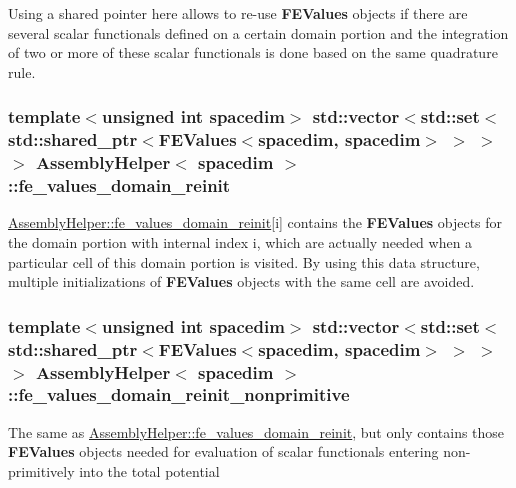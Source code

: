 Using a shared pointer here allows to re-\/use {\bf F\+E\+Values} objects if there are several scalar functionals defined on a certain domain portion and the integration of two or more of these scalar functionals is done based on the same quadrature rule. 
\subsubsection[{\texorpdfstring{fe\+\_\+values\+\_\+domain\+\_\+reinit}{fe_values_domain_reinit}}]{\setlength{\rightskip}{0pt plus 5cm}template$<$unsigned int spacedim$>$ std\+::vector$<$std\+::set$<$std\+::shared\+\_\+ptr$<${\bf F\+E\+Values}$<$spacedim, spacedim$>$ $>$ $>$ $>$ {\bf Assembly\+Helper}$<$ spacedim $>$\+::fe\+\_\+values\+\_\+domain\+\_\+reinit\hspace{0.3cm}{\ttfamily [private]}}\hypertarget{class_assembly_helper_a28b58551c6afc68c7beaaa2604bc6e92}{}\label{class_assembly_helper_a28b58551c6afc68c7beaaa2604bc6e92}
\hyperlink{class_assembly_helper_a28b58551c6afc68c7beaaa2604bc6e92}{Assembly\+Helper\+::fe\+\_\+values\+\_\+domain\+\_\+reinit}\mbox{[}{\ttfamily i}\mbox{]} contains the {\bf F\+E\+Values} objects for the domain portion with internal index {\ttfamily i}, which are actually needed when a particular cell of this domain portion is visited. By using this data structure, multiple initializations of {\bf F\+E\+Values} objects with the same cell are avoided. 
\subsubsection[{\texorpdfstring{fe\+\_\+values\+\_\+domain\+\_\+reinit\+\_\+nonprimitive}{fe_values_domain_reinit_nonprimitive}}]{\setlength{\rightskip}{0pt plus 5cm}template$<$unsigned int spacedim$>$ std\+::vector$<$std\+::set$<$std\+::shared\+\_\+ptr$<${\bf F\+E\+Values}$<$spacedim, spacedim$>$ $>$ $>$ $>$ {\bf Assembly\+Helper}$<$ spacedim $>$\+::fe\+\_\+values\+\_\+domain\+\_\+reinit\+\_\+nonprimitive\hspace{0.3cm}{\ttfamily [private]}}\hypertarget{class_assembly_helper_a3c592ef0a148753891cc3e03fd08324c}{}\label{class_assembly_helper_a3c592ef0a148753891cc3e03fd08324c}
The same as \hyperlink{class_assembly_helper_a28b58551c6afc68c7beaaa2604bc6e92}{Assembly\+Helper\+::fe\+\_\+values\+\_\+domain\+\_\+reinit}, but only contains those {\bf F\+E\+Values} objects needed for evaluation of scalar functionals entering non-\/primitively into the total potential 

